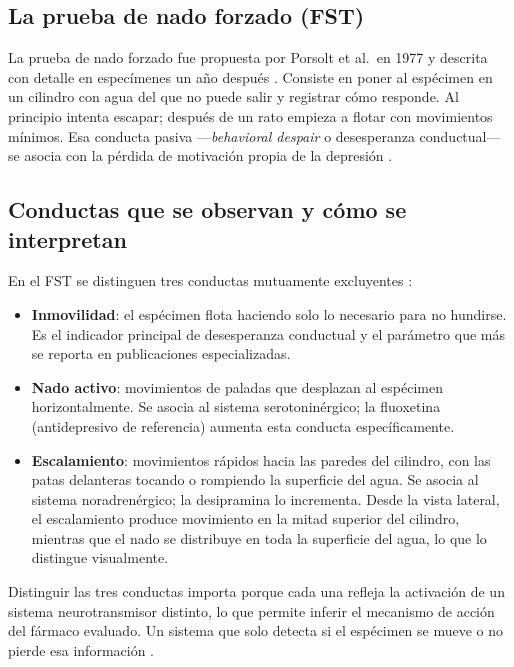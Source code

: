 \subsection{La prueba de nado forzado (FST)}

La prueba de nado forzado fue propuesta por Porsolt et al.\ en 1977 \cite{porsolt1977} y
descrita con detalle en especímenes un año después \cite{porsolt1978}.
Consiste en poner al espécimen en un cilindro con agua del que no puede salir y registrar
cómo responde. Al principio intenta escapar; después de un rato empieza a flotar con
movimientos mínimos. Esa conducta pasiva ---\textit{behavioral despair} o desesperanza
conductual--- se asocia con la pérdida de motivación propia de la depresión
\cite{armario2021}.

\subsection{Conductas que se observan y cómo se interpretan}

En el FST se distinguen tres conductas mutuamente excluyentes \cite{armario2021}:

\begin{itemize}
    \item \textbf{Inmovilidad}: el espécimen flota haciendo solo lo necesario para no
          hundirse. Es el indicador principal de desesperanza conductual y el parámetro
          que más se reporta en publicaciones especializadas.

    \item \textbf{Nado activo}: movimientos de paladas que desplazan al espécimen
          horizontalmente. Se asocia al sistema serotoninérgico; la fluoxetina (antidepresivo de referencia) aumenta
          esta conducta específicamente.

    \item \textbf{Escalamiento}: movimientos rápidos hacia las paredes del cilindro,
          con las patas delanteras tocando o rompiendo la superficie del agua. Se asocia
          al sistema noradrenérgico; la desipramina lo incrementa. Desde la vista lateral, el escalamiento produce movimiento en la mitad superior del
          cilindro, mientras que el nado se distribuye en toda la superficie del agua, lo que
          lo distingue visualmente.
\end{itemize}

Distinguir las tres conductas importa porque cada una refleja la activación de un sistema
neurotransmisor distinto, lo que permite inferir el mecanismo de acción del fármaco
evaluado. Un sistema que solo detecta si el espécimen se mueve o no pierde esa información
\cite{della_valle2025}.

